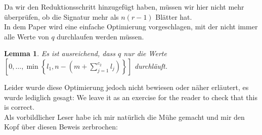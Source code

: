 \documentclass[a4paper,10pt,ngerman]{scrartcl}
\newtheorem{lemma}[satz]{Lemma}
\begin{document}
    Da wir den Reduktionsschritt hinzugefügt haben, müssen wir hier nicht mehr überprüfen, ob die Signatur mehr als $n (r - 1)$ Blätter hat. \\
    In dem Paper\autocite{golin_dynamic_1998} wird eine einfache Optimierung vorgeschlagen, mit der nicht immer alle Werte von $q$ durchlaufen werden müssen.
    \begin{lemma}
        \label{lem:reader_1}
        Es ist ausreichend, dass $q$ nur die Werte $\left[0, \dots, \min\left\{l_1, n - \left(m + \sum^{c_2}_{j=1} l_j\right)\right\}\right]$ durchläuft.
    \end{lemma}
    Leider wurde diese Optimierung jedoch nicht bewiesen oder näher erläutert, es wurde lediglich gesagt: \glqq We leave it as an exercise for the reader to check that this is correct.\grqq \\
    Als vorbildlicher Leser habe ich mir natürlich die Mühe gemacht und mir den Kopf über diesen Beweis zerbrochen:
\end{document}

